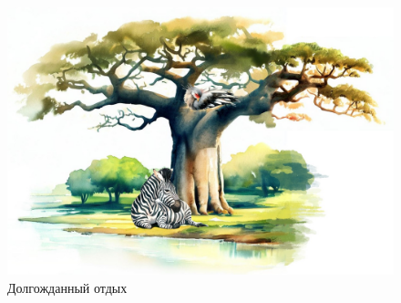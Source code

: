 \documentclass[a5paper,11pt]{memoir}
\begin{document}
\begin{figure}[h]
	\hspace{-1cm}\includegraphics[width=\paperwidth]{images/baobab-nap.jpeg}
	\caption{Долгожданный отдых}
\end{figure}


\clearpage
\end{document}

